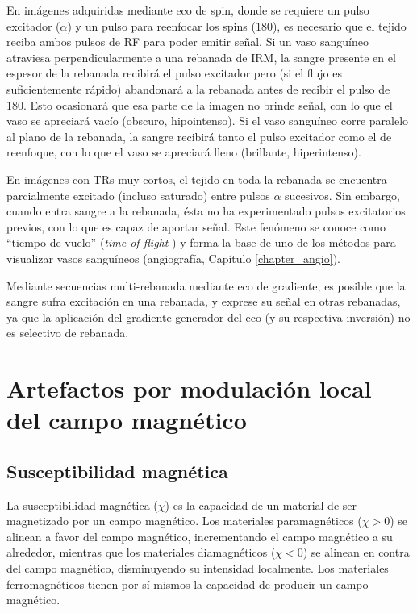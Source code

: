 En imágenes adquiridas mediante eco de spin, donde se requiere un pulso excitador ($\alpha$\degrees) y un pulso para reenfocar los spins (180\degrees), es necesario que el tejido reciba ambos pulsos de RF para poder emitir señal. Si un vaso sanguíneo atraviesa perpendicularmente a una rebanada de IRM, la sangre presente en el espesor de la rebanada recibirá el pulso excitador pero (si el flujo es suficientemente rápido) abandonará a la rebanada antes de recibir el pulso de 180\degrees. Esto ocasionará que esa parte de la imagen no brinde señal, con lo que el vaso se apreciará vacío (obscuro, hipointenso). Si el vaso sanguíneo corre paralelo al plano de la rebanada, la sangre recibirá tanto el pulso excitador como el de reenfoque, con lo que el vaso se apreciará lleno (brillante, hiperintenso).

En imágenes con TRs muy cortos, el tejido en toda la rebanada se encuentra parcialmente excitado (incluso saturado) entre pulsos $\alpha$ sucesivos. Sin embargo, cuando entra sangre a la rebanada, ésta no ha experimentado pulsos excitatorios previos, con lo que es capaz de aportar señal. Este fenómeno se conoce como ``tiempo de vuelo'' (\textit{time-of-flight} ) y forma la base de uno de los métodos para visualizar vasos sanguíneos (angiografía, Capítulo \ref{chapter_angio}). 

Mediante secuencias multi-rebanada mediante eco de gradiente, es posible que la sangre sufra excitación en una rebanada, y exprese su señal en otras rebanadas, ya que la aplicación del gradiente generador del eco (y su respectiva inversión) no es selectivo de rebanada. 


\section{Artefactos por modulación local del campo magnético}
\subsection{Susceptibilidad magnética}
La susceptibilidad magnética ($\chi$) es la capacidad de un material de ser magnetizado por un campo magnético. Los materiales paramagnéticos ($\chi>0$) se alinean a favor del campo magnético, incrementando el campo magnético a su alrededor, mientras que los materiales diamagnéticos ($\chi<0$) se alinean en contra del campo magnético, disminuyendo su intensidad localmente. Los materiales ferromagnéticos tienen por sí mismos la capacidad de producir un campo magnético.

